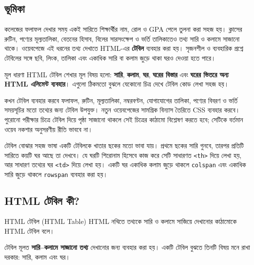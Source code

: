 \subsection{ভূমিকা}

কলেজের ফলাফল দেখার সময় একই সারিতে শিক্ষার্থীর নাম, রোল ও GPA পেলে তুলনা করা সহজ হয়। ক্লাসের রুটিন, পণ্যের মূল্যতালিকা, বেতনের হিসাব, বিলের সারসংক্ষেপ ও ভর্তি তালিকাতেও তথ্য সারি ও কলামে সাজানো থাকে। ওয়েবপেজে এই ধরনের তথ্য দেখাতে HTML-এর \textbf{টেবিল} ব্যবহার করা হয়। সৃজনশীল ও ব্যবহারিক প্রশ্নে টেবিলের সঙ্গে ছবি, লিংক, তালিকা এবং একাধিক সারি বা কলাম জুড়ে থাকা ঘরও দেওয়া হতে পারে।

\begin{keypointbox}{মূল ধারণা}
HTML টেবিল শেখার মূল বিষয় হলো: \textbf{সারি}, \textbf{কলাম}, \textbf{ঘর}, \textbf{ঘরের বিস্তার} এবং \textbf{ঘরের ভিতরে অন্য HTML এলিমেন্ট ব্যবহার}। এগুলো ঠিকমতো বুঝলে যেকোনো চিত্র দেখে টেবিল কোড লেখা সহজ হয়।
\end{keypointbox}

\begin{boardbox}{কখন টেবিল ব্যবহার করবে}
ফলাফল, রুটিন, মূল্যতালিকা, নম্বরবণ্টন, যোগাযোগের তালিকা, পণ্যের বিবরণ ও ভর্তি সময়সূচির মতো তথ্যের জন্য টেবিল উপযুক্ত। নতুন ওয়েবপেজের সামগ্রিক বিন্যাস তৈরিতে CSS ব্যবহার করবে। পুরোনো পরীক্ষার চিত্রে টেবিল দিয়ে পৃষ্ঠা সাজানো থাকলে সেই চিত্রের কাঠামো বিশ্লেষণ করতে হবে; সেটিকে বর্তমান ওয়েব নকশার অনুসরণীয় রীতি ভাববে না।
\end{boardbox}

\begin{keypointbox}{টেবিল বোঝার সহজ ভাষা}
একটি টেবিলকে খাতার ছকের মতো ভাবা যায়। প্রথমে ছকের সারি গুনবে, তারপর প্রতিটি সারিতে কয়টি ঘর আছে তা দেখবে। যে ঘরটি শিরোনাম হিসেবে কাজ করে সেটি সাধারণত \texttt{<th>} দিয়ে লেখা হয়, আর সাধারণ তথ্যের ঘর \texttt{<td>} দিয়ে লেখা হয়। একটি ঘর একাধিক কলাম জুড়ে থাকলে \texttt{colspan} এবং একাধিক সারি জুড়ে থাকলে \texttt{rowspan} ব্যবহার করা হয়।
\end{keypointbox}

\subsection{HTML টেবিল কী?}

\begin{definitionbox}{HTML টেবিল (HTML Table)}
HTML নথিতে তথ্যকে সারি ও কলামে সাজিয়ে দেখানোর কাঠামোকে HTML টেবিল বলে।
\end{definitionbox}

টেবিল মূলত \textbf{সারি–কলামে সাজানো তথ্য} দেখানোর জন্য ব্যবহার করা হয়। একটি টেবিল বুঝতে তিনটি বিষয় মনে রাখা দরকার: সারি, কলাম এবং ঘর।

